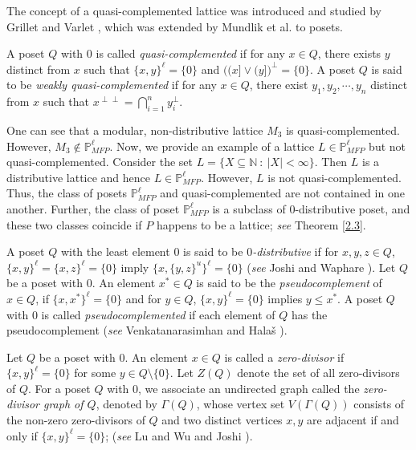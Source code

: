 \documentclass[10pt,one side,emlines]{amsart}
\theoremstyle{definition}
\begin{document}
The concept of a quasi-complemented lattice was introduced and studied by Grillet and Varlet \cite{GV}, which was extended by Mundlik et al. \cite{MJH} to posets.

A poset $Q$ with $0$ is called \textit{quasi-complemented} if for any $x\in Q$, there exists $y$ distinct from $x$ such that $\{x,y\}^{\ell} = \{0\}$ and $ \bigg((x] \vee (y]\bigg)^{\perp } = \{0\}$. A poset $Q$ is said to be \textit{weakly quasi-complemented} if for any $x \in Q$, there exist $y_1, y_2,\cdots, y_n$ distinct from $x$ such that $x^{\perp \perp} = \bigcap_{i=1}^{n}y_{i}^{\perp }$.

One can see that a modular, non-distributive lattice $M_3$ is quasi-complemented. However, $M_3 \notin \mathbb{P}^{\ell}_{MFP}$. Now, we provide an example of a lattice $L\in \mathbb{P}^{\ell}_{MFP}$ but not quasi-complemented. Consider the set $L=\{X\subseteq \mathbb{N}~:~|X|< \infty\}$. Then $L$ is a distributive lattice and hence $L\in \mathbb{P}^{\ell}_{MFP}$. However, $L$ is not quasi-complemented. Thus, the class of posets $\mathbb{P}^{\ell}_{MFP}$ and quasi-complemented are not contained in one another. Further, the class of poset $\mathbb{P}^{\ell}_{MFP}$ is a subclass of $0$-distributive poset, and these two classes coincide if $P$ happens to be a lattice; \textit{see} Theorem \ref{2.3}.

A poset $Q$ with the least element $0$ is said to be \textit{$0$-distributive} if for $x, y, z \in Q$, $\{x, y\}^{\ell} = \{x,z\}^{\ell} = \{0\}$ imply $\{x, \{y,z\}^u\}^{\ell} = \{0\}$ (\textit{see} Joshi and Waphare \cite{JW}). Let $Q$ be a poset with $0$. An element $x^* \in Q$ is said to be the \textit{pseudocomplement} of $x \in Q$, if $\{x, x^*\}^{\ell} = \{0\}$ and for $y \in Q$, $\{x, y\}^{\ell} =\{0\}$ implies $y\leq x^*$. A poset $Q$ with $0$ is called \textit{pseudocomplemented} if each element of $Q$ has the pseudocomplement (\textit{see} Venkatanarasimhan \cite{V} and Hala\v s \cite{H}).

Let $Q$ be a poset with $0$. An element $x \in Q$ is called a \textit{zero-divisor} if $\{x,y\}^\ell=\{0\}$ for some $y \in Q\setminus \{0\}$. Let $Z(Q)$ denote the set of all zero-divisors of $Q$. For a poset $Q$ with $0$, we associate an undirected graph called the \textit{zero-divisor graph of $Q$}, denoted by $\Gamma(Q)$, whose vertex set $V(\Gamma(Q))$ consists of the non-zero zero-divisors of $Q$ and two distinct vertices $x,y$ are adjacent if and only if $\{x, y\}^ {\ell} = \{0\}$; (\textit{see} Lu and Wu \cite{LW} and Joshi \cite{J}).
\end{document}
